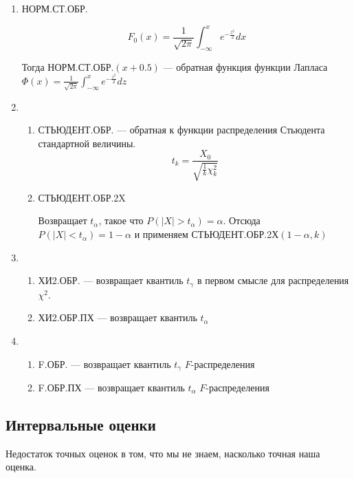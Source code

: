 \begin{enumerate}
    \item НОРМ.СТ.ОБР.

          \[F_0(x) = \frac{1}{\sqrt{2 \pi}} \int_{-\infty
              }^x e^{-\frac{z^2}{2}} dx \]

          Тогда \(\mathrm{НОРМ.СТ.ОБР.}(x + 0.5)\) --- обратная функция функции Лапласа \(\Phi(x) = \frac{1}{\sqrt{2 \pi}} \int_{ - \infty }^x e^{ - \frac{z^2}{2}} dz\)

    \item \begin{enumerate}
              \item СТЬЮДЕНТ.ОБР. --- обратная к функции распределения Стьюдента стандартной величины.
                    \[t_k = \frac{X_0}{\sqrt{\frac{1}{k} \chi_k^2}}\]
              \item СТЬЮДЕНТ.ОБР.2X

                    Возвращает \(t_\alpha\), такое что \(P(|X| > t_\alpha) = \alpha\). Отсюда \(P(|X| < t_\alpha) = 1 - \alpha\) и применяем СТЬЮДЕНТ.ОБР.2Х\((1 - \alpha, k)\)
          \end{enumerate}

    \item \begin{enumerate}
              \item ХИ2.ОБР. --- возвращает квантиль \(t_\gamma\) в первом смысле для распределения \(\chi^2\).
              \item ХИ2.ОБР.ПХ --- возвращает квантиль \(t_\alpha\)
          \end{enumerate}

    \item \begin{enumerate}
              \item F.ОБР. --- возвращает квантиль \(t_\gamma\) \(F\)-распределения
              \item F.ОБР.ПХ --- возвращает квантиль \(t_\alpha\) \(F\)-распределения
          \end{enumerate}
\end{enumerate}

\subsection{Интервальные оценки}

Недостаток точных оценок в том, что мы не знаем, насколько точная наша оценка.

